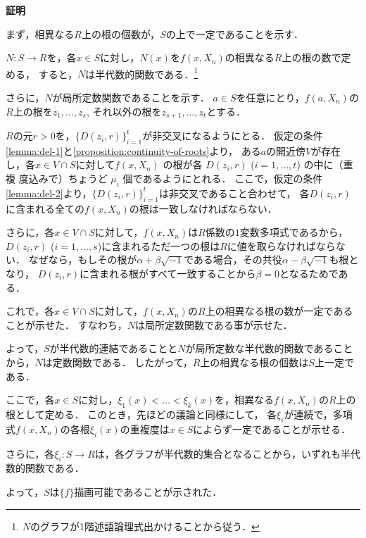\documentclass[uplatex, dvipdfmx]{jsarticle}
\makeatletter
\numberwithin{equation}{section}
\renewenvironment{proof}[1][\proofname]{\par
  \pushQED{\qed}%
  \normalfont \topsep6\p@\@plus6\p@\relax
  \trivlist
  \item\relax
  {\bfseries
  #1\@addpunct{.}}\hspace\labelsep\ignorespaces
}{
  \popQED\endtrivlist\@endpefalse
}
\newcommand{\map}[3]{{#1}\colon{#2}\rightarrow{#3}}
\theoremstyle{definition}
\renewcommand{\proofname}{\textbf{証明}}
\makeatother
\begin{document}
\begin{proof}
     まず，相異なる$R$上の根の個数が，$S$の上で一定であることを示す．

     $\map{N}{S}{R}$を，各$x \in S$に対し，$N(x)$を$f(x,X_n)$の相異なる$R$上の根の数で定める，
     すると，$N$は半代数的関数である．\footnote{$N$のグラフが1階述語論理式出かけることから従う．}
     
     さらに，$N$が局所定数関数であることを示す．
     $a \in S$を任意にとり，$f(a,X_n)$の$R$上の根を$z_1, \dots, z_s$, それ以外の根を$z_{s+1}, \dots, z_t$とする．

     $R$の元$r > 0$を，$\{D(z_i,r)\}_{i=1}^t$が非交叉になるようにとる．
     仮定の条件\ref{lemma:del-1}と\cref{proposition:continuity-of-roots}より，
     ある$a$の開近傍$V$が存在し，各$x \in V \cap S$に対して$f (x, X_n)$ の根が各 $D(z_i, r)$ ($i = 1, \dots , t$) の中に（重複
     度込みで）ちょうど $\mu_i$ 個であるようにとれる．
     ここで，仮定の条件\ref{lemma:del-2}より，$\{D(z_i, r)\}_{i=1}^t$は非交叉であること合わせて，
     各$D(z_i, r)$に含まれる全ての$f(x, X_n)$の根は一致しなければならない．

     さらに，各$x \in V \cap S$に対して，$f(x,X_n)$は$R$係数の$1$変数多項式であるから，
     $D(z_i, r)$ ($i=1, \dots, s$)に含まれるただ一つの根は$R$に値を取らなければならない．
     なぜなら，もしその根が$\alpha + \beta \sqrt{-1}$である場合，その共役$\alpha - \beta \sqrt{-1}$も根となり，
     $D(z_i, r)$に含まれる根がすべて一致することから$\beta = 0$となるためである．

     これで，各$x \in V \cap S$に対して，$f(x, X_n)$の$R$上の相異なる根の数が一定であることが示せた．
     すなわち，$N$は局所定数関数である事が示せた．

     よって，$S$が半代数的連結であることと$N$が局所定数な半代数的関数であることから，$N$は定数関数である．
     したがって，$R$上の相異なる根の個数は$S$上一定である．

     ここで，各$x \in S$に対し，$\xi_1(x) < \dots < \xi_k(x)$を，相異なる$f(x, X_n)$の$R$上の根として定める．
     このとき，先ほどの議論と同様にして，
     各$\xi_i$が連続で，多項式$f(x,X_n)$の各根$\xi_i(x)$の重複度は$x \in S$によらず一定であることが示せる．

     さらに，各$\map{\xi_i}{S}{R}$は，各グラフが半代数的集合となることから，いずれも半代数的関数である．

     よって，$S$は$\{f\}$描画可能であることが示された．
\end{proof}
\end{document}
